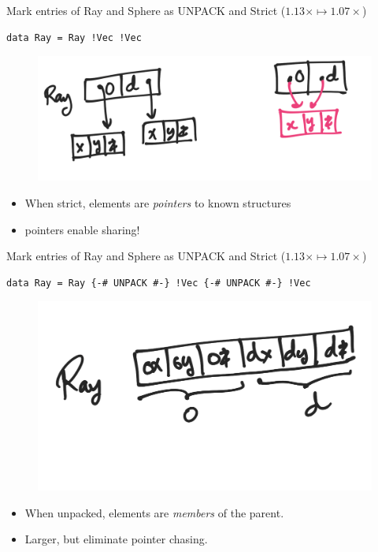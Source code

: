 \documentclass[8pt]{beamer}
\begin{document}
\begin{frame}[fragile]{Mark entries of Ray and Sphere as UNPACK and Strict ($1.13 \times \mapsto 1.07\times$)}
\begin{verbatim}
data Ray = Ray !Vec !Vec
\end{verbatim}

\begin{figure}
\includegraphics[height=0.4\textheight]{./ray-strict.png}
\end{figure}

\begin{itemize}
\item When strict, elements are \emph{pointers} to known structures
\item pointers enable sharing!
\end{itemize}

\end{frame}

\begin{frame}[fragile]{Mark entries of Ray and Sphere as UNPACK and Strict ($1.13 \times \mapsto 1.07\times$)}
\begin{verbatim}
data Ray = Ray {-# UNPACK #-} !Vec {-# UNPACK #-} !Vec 
\end{verbatim}

\begin{figure}
\includegraphics[height=0.4\textheight]{./ray-unpack.png}
\end{figure}

\begin{itemize}
\item When unpacked, elements are \emph{members} of the parent.
\item Larger, but eliminate pointer chasing.
\end{itemize}
\end{frame}
\end{document}
